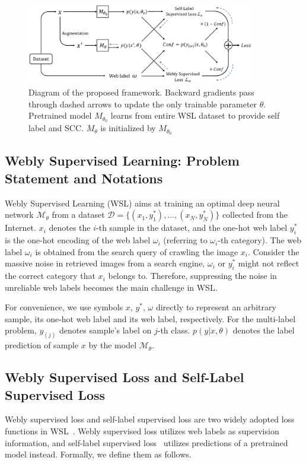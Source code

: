 \documentclass[runningheads]{llncs}
\begin{document}
\begin{figure}[t]
	\centering
	\includegraphics[width=10cm]{figure/pipeline0710.pdf}
	\smallskip
	\caption{Diagram of the proposed framework. Backward gradients pass through dashed arrows to update the only trainable parameter $\theta$. Pretrained model $M_{\theta_0}$ learns from entire WSL dataset to provide self label and SCC. $M_{\theta}$ is initialized by $M_{\theta_0}$}
	\label{Fig:pipeline}
\end{figure}
	
\subsection{Webly Supervised Learning: Problem Statement and Notations}
\label{S:method-problem}
Webly Supervised Learning (WSL) aims at training an optimal deep neural network $\mathcal{M_\theta}$ from a dataset $\mathcal{D}=\{(x_1, y^*_1),\dots,(x_N, y^*_N)\}$ collected from the Internet.
$x_i$ denotes the $i$-th sample in the dataset, and the one-hot web label $y^*_i$ is the one-hot encoding of the web label $\omega_i$ (referring to $\omega_i$-th category). The web label $\omega_i$ is obtained from the search query of crawling the image $x_i$. Consider the massive noise in retrieved images from a search engine, $\omega_i$ or $y_i^*$ might not reflect the correct category that $x_i$ belongs to. Therefore, suppressing the noise in unreliable web labels becomes the main challenge in WSL.

For convenience, we use symbols $x$, $y^*$, $\omega$ directly to represent an arbitrary sample, its one-hot web label and its web label, respectively. For the multi-label problem, $y_{(j)}$ denotes sample's label on $j$-th class.
$p(y|x,\theta)$ denotes the label prediction of sample $x$ by the model $\mathcal{M}_\theta$.
	
\subsection{Webly Supervised Loss and Self-Label Supervised Loss}
\label{S:method-loss}
Webly supervised loss and self-label supervised loss are two widely adopted loss functions in WSL~\cite{guo2018curriculumnet,han2019deep,reed2014bootstrap,tanaka2018joint}. 
Webly supervised loss utilizes web labels as supervision information, and self-label supervised loss~\cite{han2019deep,tanaka2018joint} utilizes predictions of a pretrained model instead. Formally, we define them as follows.
\end{document}
